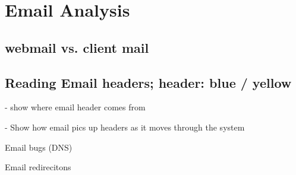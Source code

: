 \chapter{Email Analysis}

\section{webmail vs. client mail}

\section{Reading Email headers; header: blue / yellow}
- show where email header comes from

 - Show how email pics up headers as it moves through the system

Email bugs  (DNS)

Email redirecitons


